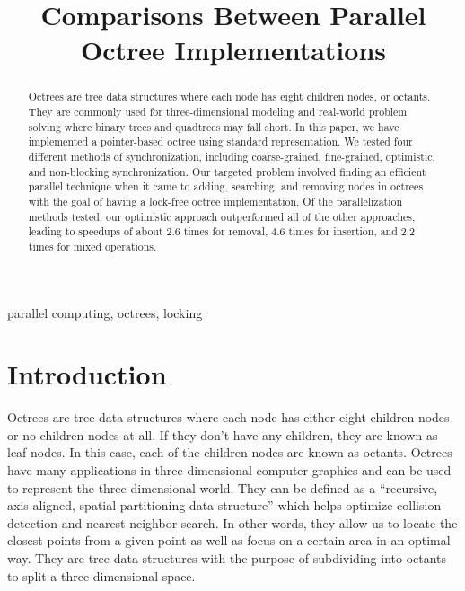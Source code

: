 \documentclass[conference]{IEEEtran}
\begin{document}
\title{Comparisons Between Parallel Octree Implementations
}

\author{

}


\maketitle

\begin{abstract}
Octrees are tree data structures where each node has eight children nodes, or octants. They are commonly used for three-dimensional modeling and real-world problem solving where binary trees and quadtrees may fall short. In this paper, we have implemented a pointer-based octree using standard representation. We tested four different methods of synchronization, including coarse-grained, fine-grained, optimistic, and non-blocking synchronization. Our targeted problem involved finding an efficient parallel technique when it came to adding, searching, and removing nodes in octrees with the goal of having a lock-free octree implementation. Of the parallelization methods tested, our optimistic approach outperformed all of the other approaches, leading to speedups of about 2.6 times for removal, 4.6 times for insertion, and 2.2 times for mixed operations. 

\end{abstract}

\begin{IEEEkeywords}
parallel computing, octrees, locking
\end{IEEEkeywords}

\section{Introduction} \label{sec:sec1}

Octrees are tree data structures where each node has either eight children nodes or no children nodes at all. If they don't have any children, they are known as leaf nodes. In this case, each of the children nodes are known as octants. Octrees have many applications in three-dimensional computer graphics and can be used to represent the three-dimensional world. They can be defined as a “recursive, axis-aligned, spatial partitioning data structure” \cite[para. 1]{octrees1} which helps optimize collision detection and nearest neighbor search. In other words, they allow us to locate the closest points from a given point as well as focus on a certain area in an optimal way. They are tree data structures with the purpose of subdividing into octants to split a three-dimensional space.
\end{document}

